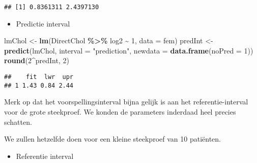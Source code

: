 \documentclass[
  12pt,dutch,coursenotes]{book}
\newenvironment{Shaded}{\begin{snugshade}}{\end{snugshade}}
\newcommand{\DataTypeTok}[1]{\textcolor[rgb]{0.13,0.29,0.53}{#1}}
\newcommand{\DecValTok}[1]{\textcolor[rgb]{0.00,0.00,0.81}{#1}}
\newcommand{\KeywordTok}[1]{\textcolor[rgb]{0.13,0.29,0.53}{\textbf{#1}}}
\newcommand{\NormalTok}[1]{#1}
\newcommand{\OperatorTok}[1]{\textcolor[rgb]{0.81,0.36,0.00}{\textbf{#1}}}
\newcommand{\StringTok}[1]{\textcolor[rgb]{0.31,0.60,0.02}{#1}}
\providecommand{\tightlist}{%
  \setlength{\itemsep}{0pt}\setlength{\parskip}{0pt}}
\theoremstyle{definition}
\theoremstyle{definition}
\theoremstyle{definition}
\theoremstyle{remark}
\begin{document}
\begin{verbatim}
## [1] 0.8361311 2.4397130
\end{verbatim}

\begin{itemize}
\tightlist
\item
  Predictie interval
\end{itemize}

\begin{Shaded}
\begin{Highlighting}[]
\NormalTok{lmChol \textless{}{-}}\StringTok{ }\KeywordTok{lm}\NormalTok{(DirectChol }\OperatorTok{\%\textgreater{}\%}\StringTok{ }\NormalTok{log2 }\OperatorTok{\textasciitilde{}}\StringTok{ }\DecValTok{1}\NormalTok{, }\DataTypeTok{data =}\NormalTok{ fem)}
\NormalTok{predInt \textless{}{-}}\StringTok{ }\KeywordTok{predict}\NormalTok{(lmChol, }\DataTypeTok{interval =} \StringTok{"prediction"}\NormalTok{, }
    \DataTypeTok{newdata =} \KeywordTok{data.frame}\NormalTok{(}\DataTypeTok{noPred =} \DecValTok{1}\NormalTok{))}
\KeywordTok{round}\NormalTok{(}\DecValTok{2}\OperatorTok{\^{}}\NormalTok{predInt, }\DecValTok{2}\NormalTok{)}
\end{Highlighting}
\end{Shaded}

\begin{verbatim}
##    fit  lwr  upr
## 1 1.43 0.84 2.44
\end{verbatim}

Merk op dat het voorspellingsinterval bijna gelijk is aan het referentie-interval voor de grote steekproef. We konden de parameters inderdaad heel precies schatten.

We zullen hetzelfde doen voor een kleine steekproef van 10 patiënten.

\begin{itemize}
\tightlist
\item
  Referentie interval
\end{itemize}
\end{document}
